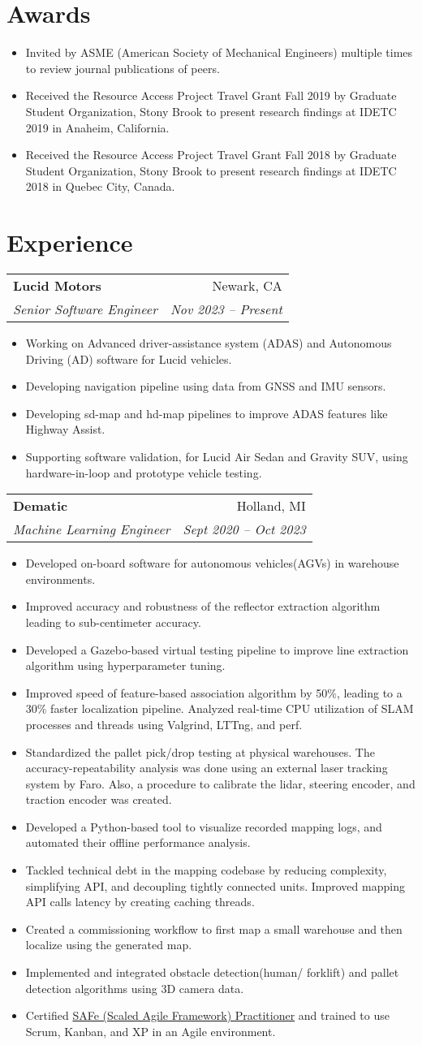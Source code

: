 \documentclass[letterpaper,10pt]{article}
\makeatletter
\newcommand{\resumeHeading}[4]{
  \vspace{-1pt}
    \begin{tabular*}{0.97\textwidth}{l@{\extracolsep{\fill}}r}
      \textbf{#1} & #2 \vspace{-2pt}\\ \vspace{1pt}
      \textit{\small#3} & \textit{\small #4} \\
    \end{tabular*}
}
\newcommand{\resumeSection}[1]{
\vspace{-12pt}
\section{\textbf{#1}}
}
\newcommand{\resumeItemListStart}{
\vspace{-7pt}
\begin{itemize}[leftmargin=14pt]
}
\newcommand{\resumeItemListEnd}{
\vspace{+7pt}
\end{itemize}
}
\newcommand{\resumeItem}[1]{
  \item\small{
      {#1 \vspace{-7pt}
      }
  }
}
\makeatother
\begin{document}
\resumeSection{Awards}
\vspace{+7pt}

\resumeItemListStart
\resumeItem{Invited by ASME (American Society of Mechanical Engineers) multiple times to review journal publications of peers.}
\resumeItem{Received the Resource Access Project Travel Grant Fall 2019 by Graduate Student Organization, Stony Brook to present research findings at IDETC 2019 in Anaheim, California.}
\resumeItem{Received the Resource Access Project Travel Grant Fall 2018 by Graduate Student Organization, Stony Brook to present research findings at IDETC 2018 in Quebec City, Canada.}
\resumeItemListEnd



\resumeSection{Experience}

\resumeHeading
{Lucid Motors}{Newark, CA}
{Senior Software Engineer}{Nov 2023 -- Present}
\resumeItemListStart
\resumeItem{Working on Advanced driver-assistance system (ADAS) and Autonomous Driving (AD) software for Lucid vehicles.}
\resumeItem{Developing navigation pipeline using data from GNSS and IMU sensors.}
\resumeItem{Developing sd-map and hd-map pipelines to improve ADAS features like Highway Assist.}
\resumeItem{Supporting software validation, for Lucid Air Sedan and Gravity SUV, using hardware-in-loop and prototype vehicle testing.}
\resumeItemListEnd

\resumeHeading
{Dematic}{Holland, MI}
{Machine Learning Engineer}{Sept 2020 -- Oct 2023}
\resumeItemListStart
\resumeItem{Developed  on-board software for autonomous vehicles(AGVs) in warehouse environments.}
\resumeItem{Improved accuracy and robustness of the reflector extraction algorithm leading to sub-centimeter accuracy.}
\resumeItem{Developed a Gazebo-based virtual testing pipeline to improve line extraction algorithm using hyperparameter tuning.}
\resumeItem{Improved speed of feature-based association algorithm by 50\%, leading to a 30\% faster localization pipeline. Analyzed real-time CPU utilization of SLAM processes and threads using Valgrind, LTTng, and perf.}
\resumeItem{Standardized the pallet pick/drop testing at physical warehouses. The accuracy-repeatability analysis was done using an external laser tracking system by Faro. Also, a procedure to calibrate the lidar, steering encoder, and traction encoder was created.}
\resumeItem{Developed a Python-based tool to visualize recorded mapping logs, and automated their offline performance analysis.}
\resumeItem{Tackled technical debt in the mapping codebase by reducing complexity, simplifying API, and decoupling tightly connected units. Improved mapping API calls latency by creating caching threads.}
\resumeItem{Created a commissioning workflow to first map a small warehouse and then localize using the generated map.}
\resumeItem{Implemented and integrated obstacle detection(human/ forklift) and pallet detection algorithms using 3D camera data.}
\resumeItem{Certified \href{https://www.youracclaim.com/go/eCNozIcD}{SAFe (Scaled Agile Framework) Practitioner} and trained to use Scrum, Kanban, and XP in an Agile environment.}
\resumeItemListEnd
\end{document}
